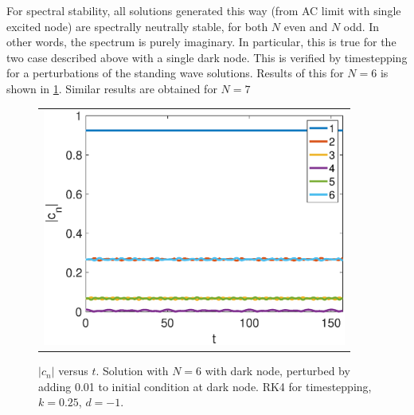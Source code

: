 \documentclass[12pt]{article}
\begin{document}
For spectral stability, all solutions generated this way (from AC limit with single excited node) are spectrally neutrally stable, for both $N$ even and $N$ odd. In other words, the spectrum is purely imaginary. In particular, this is true for the two case described above with a single dark node. This is verified by timestepping for a perturbations of the standing wave solutions. Results of this for $N=6$ is shown in \cref{fig:evenhole6perturbed}. Similar results are obtained for $N=7$

\begin{figure}[H]
\begin{center}
\begin{tabular}{c}
\includegraphics[width=10cm]{images/evenhole6perturbed.eps}
\end{tabular}
\end{center}
\caption{$|c_n|$ versus $t$. Solution with $N=6$ with dark node, perturbed by adding 0.01 to initial condition at dark node. RK4 for timestepping, $k=0.25$, $d=-1$.}
\label{fig:evenhole6perturbed}
\end{figure}




\end{document}
